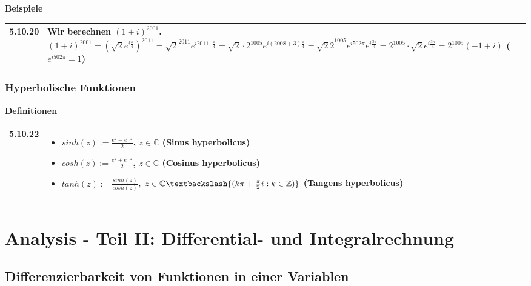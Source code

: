    \noindent
    \textbf{Beispiele}
    \begin{table}[H]
    \begin{tabularx}{\textwidth}{X m{16cm}}
        \toprule

        5.10.20&Wir berechnen $(1+i)^{2001}$. \hfill \break
                $(1+i)^{2001} = (\sqrt{2}e^{i\frac{\pi}{4}})^{2011} = \sqrt{2}^{2011} e^{i2011\cdot \frac{\pi}{4}} =
                \sqrt{2} \cdot 2^{1005} e^{i(2008+3)\frac{\pi}{4}} = \sqrt{2} \dot 2^1005 e^{i502\pi}e^{i\frac{3\pi}{4}}= 
                2^{1005} \cdot \sqrt{2} e^{i\frac{3\pi}{4}} = 2^{1005} (-1+i)$ ($e^{i502\pi} =1$)\\

        \bottomrule
    \end{tabularx}
    \end{table}

\subsubsection{Hyperbolische Funktionen}

    \noindent
    \textbf{Definitionen}
    \begin{table}[H]  
    \begin{tabularx}{\textwidth}{X m{16cm}}
        \toprule

        5.10.22&\begin{itemize}
                    \item[] $sinh(z) := \frac{e^z-e^{-z}}{2}$, $z \in \mathbb{C}$ (\textbf{Sinus hyperbolicus})
                    \item[] $cosh(z) := \frac{e^z+e^{-z}}{2}$, $z \in \mathbb{C}$ (\textbf{Cosinus hyperbolicus})
                    \item[] $tanh(z) := \frac{sinh(z)}{cosh(z)}$, $z \in \mathbb{C} \textbackslash \{(k\pi + \frac{\pi}{2}i: k \in \mathbb{Z})\}$ (\textbf{Tangens hyperbolicus})
                \end{itemize} \\

        \bottomrule

    \end{tabularx}
    \end{table}

\section{Analysis - Teil II: Differential- und Integralrechnung}
\subsection{Differenzierbarkeit von Funktionen in einer Variablen}
